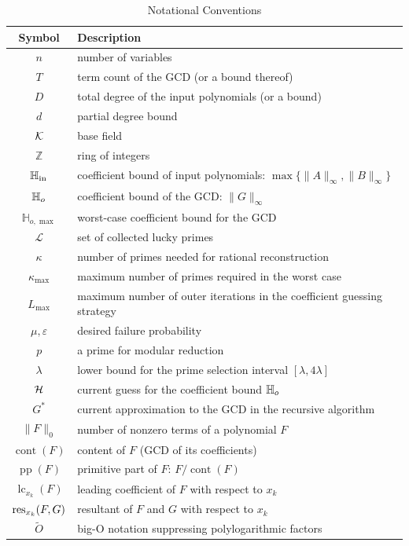\documentclass{article}
\numberwithin{equation}{section}
\begin{document}
\begin{table}[p]
\centering
\renewcommand{\arraystretch}{1.3}
\caption{Notational Conventions}
\label{tab:notation}
\begin{tabular}{c|l}
\toprule
\textbf{Symbol} & \textbf{Description} \\
\midrule
$n$ & number of variables \\
$T$ & term count of the GCD (or a bound thereof) \\
$D$ & total degree of the input polynomials (or a bound) \\
$d$ & partial degree bound \\
${\mathcal{K}}$ & base field \\
$\mathbb{Z}$ & ring of integers \\
$\mathbb{H}_{\rm in}$ & coefficient bound of input polynomials: $\max\{\|A\|_\infty,\|B\|_\infty\}$ \\
$\mathbb{H}_{o}$ & coefficient bound of the GCD: $\|G\|_\infty$ \\
$\mathbb{H}_{o,\max}$ & worst-case coefficient bound for the GCD \\
$\mathcal{L}$ & set of collected lucky primes \\
$\kappa$ & number of primes needed for rational reconstruction \\
$\kappa_{\max}$ & maximum number of primes required in the worst case \\
$L_{\max}$ & maximum number of outer iterations in the coefficient guessing strategy \\
$\mu,\varepsilon$ & desired failure probability \\
$p$ & a prime for modular reduction \\
$\lambda$ & lower bound for the prime selection interval $[\lambda, 4\lambda]$ \\
${\mathcal{H}}$ & current guess for the coefficient bound $\mathbb{H}_{o}$ \\
$G^*$ & current approximation to the GCD in the recursive algorithm \\
$\|F\|_{0}$ & number of nonzero terms of a polynomial $F$ \\
$\operatorname{cont}(F)$ & content of $F$ (GCD of its coefficients) \\
$\operatorname{pp}(F)$ & primitive part of $F$: $F / \operatorname{cont}(F)$ \\
$\operatorname{lc}_{x_k}(F)$ & leading coefficient of $F$ with respect to $x_k$ \\
$\hbox{\rm{res}}_{x_k}(F,G)$ & resultant of $F$ and $G$ with respect to $x_k$ \\
$\widetilde{O}$ & big-O notation suppressing polylogarithmic factors \\
\bottomrule
\end{tabular}
\end{table}

\end{document}
